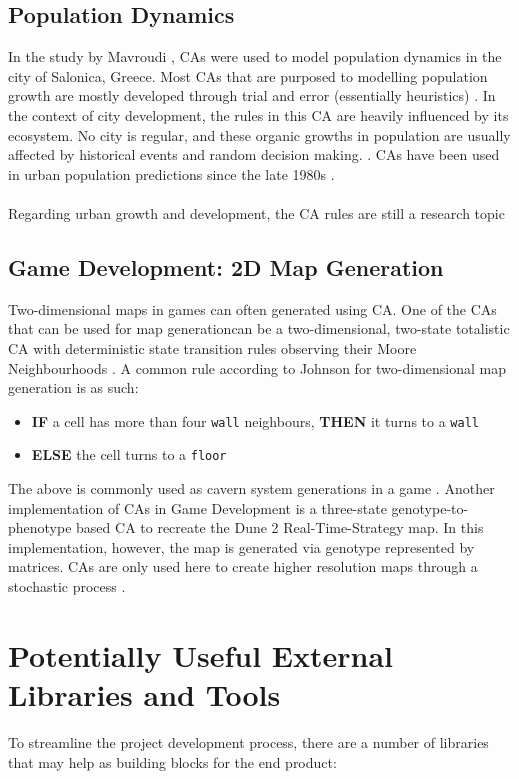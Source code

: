\subsection{Population Dynamics}
In the study by Mavroudi \cite{mavroudi}, CAs were used to model population dynamics in the city of Salonica, Greece. Most CAs that are purposed to modelling population growth are mostly developed through trial and error (essentially heuristics) \cite{wu2002calibration}. In the context of city development, the rules in this CA are heavily influenced by its ecosystem. No city is regular, and these organic growths in population are usually affected by historical events and random decision making. \cite{batty1997cellular}. CAs have been used in urban population predictions since the late 1980s \cite{batty1999modeling}. 
\\ \\
Regarding urban growth and development, the CA rules are still a research topic \cite{batty1998urban}

\subsection{Game Development: 2D Map Generation} \label{gamedevimp}
Two-dimensional maps in games can often generated using CA. One of the CAs that can be used for map generationcan be a two-dimensional, two-state totalistic CA with deterministic state transition rules observing their Moore Neighbourhoods \cite{johnson2010cellular}. A common rule according to Johnson \cite{johnson2010cellular} for two-dimensional map generation is as such: 
\begin{itemize}
    \item \textbf{IF} a cell has more than four \texttt{wall} neighbours, \textbf{THEN} it turns to a \texttt{wall}
    \item \textbf{ELSE} the cell turns to a \texttt{floor}
\end{itemize}
\noindent The above is commonly used as cavern system generations in a game \cite{ashlock2015evolvable}. Another implementation of CAs in Game Development is a three-state genotype-to-phenotype based CA to recreate the Dune 2 Real-Time-Strategy map. In this implementation, however, the map is generated via genotype represented by matrices. CAs are only used here to create higher resolution maps through a stochastic process \cite{mahlmann2012spicing}. 

\section{Potentially Useful External Libraries and Tools}
To streamline the project development process, there are a number of libraries that may help as building blocks for the end product:

